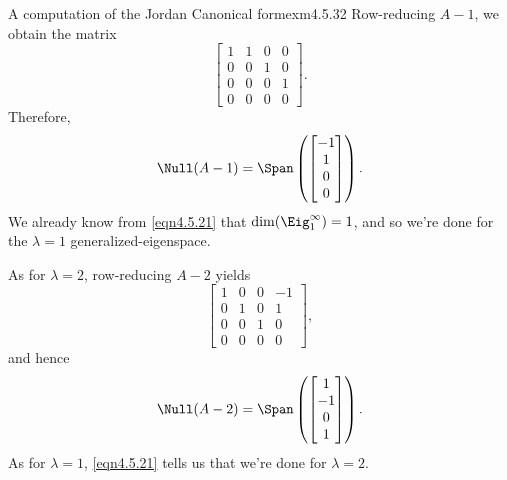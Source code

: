 \begin{exm}{A computation of the Jordan Canonical form}{exm4.5.32}
	Row-reducing $A-1$, we obtain the matrix
	\begin{equation}
		\begin{bmatrix}1 & 1 & 0 & 0 \\ 0 & 0 & 1 & 0 \\ 0 & 0 & 0 & 1 \\ 0 & 0 & 0 & 0\end{bmatrix}.
	\end{equation}
	Therefore,
	\begin{equation}
		\Null (A-1)=\Span \left( \begin{bmatrix} -1 \\ 1 \\ 0 \\ 0\end{bmatrix}\right) .
	\end{equation}
	We already know from \eqref{eqn4.5.21} that $\dim (\Eig _1^{\infty})=1$, and so we're done for the $\lambda =1$ generalized-eigenspace.
	
	As for $\lambda =2$, row-reducing $A-2$ yields
	\begin{equation}
		\begin{bmatrix}1 & 0 & 0 & -1 \\ 0 & 1 & 0 & 1 \\ 0 & 0 & 1 & 0 \\ 0 & 0 & 0 & 0\end{bmatrix},
	\end{equation}
	and hence
	\begin{equation}
		\Null (A-2)=\Span \left( \begin{bmatrix}1 \\ -1 \\ 0 \\ 1\end{bmatrix}\right) .
	\end{equation}
	As for $\lambda =1$, \eqref{eqn4.5.21} tells us that we're done for $\lambda =2$.
	

\end{exm}
